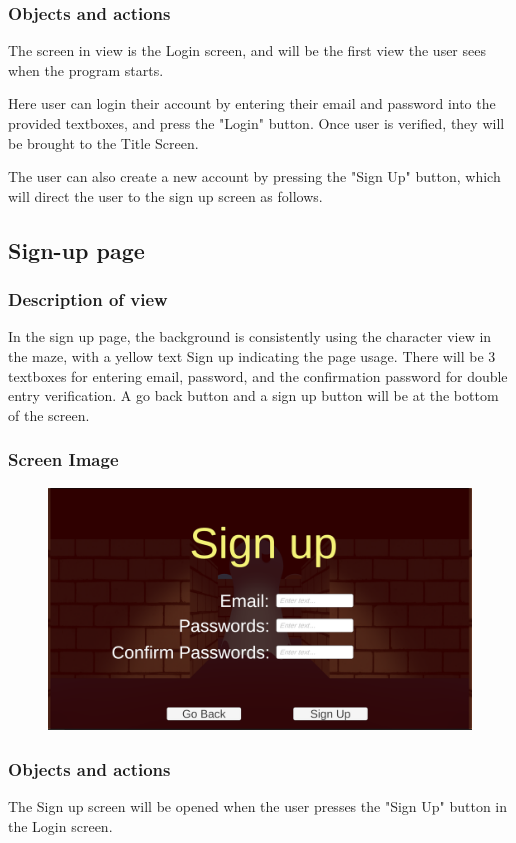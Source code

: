 \documentclass[11pt]{article}
\begin{document}
\subsubsection{Objects and actions}
The screen in view is the Login screen, and will be the first view the user sees when the program starts. 

Here user can login their account by entering their email and password into the provided textboxes, and press the "Login" button. Once user is verified, they will be brought to the Title Screen.

The user can also create a new account by pressing the "Sign Up" button, which will direct the user to the sign up screen as follows.

\subsection{Sign-up page}
\subsubsection{Description of view}
In the sign up page, the background is consistently using the character view in the maze, with a yellow text Sign up indicating the page usage. There will be 3 textboxes for entering email, password, and the confirmation password for double entry verification. A go back button and a sign up button will be at the bottom of the screen.
\subsubsection{Screen Image}
\begin{figure}[H]
    \centering
    \includegraphics*[scale=0.2]{UI0.1SignUp.png}
\end{figure}
\subsubsection{Objects and actions}
The Sign up screen will be opened when the user presses the "Sign Up" button in the Login screen. 
\end{document}
